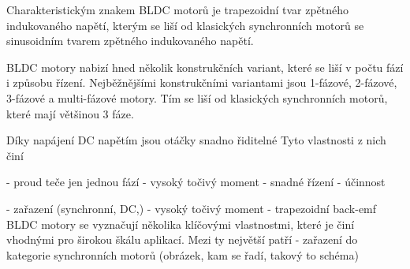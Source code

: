 Charakteristickým znakem BLDC motorů je trapezoidní tvar zpětného indukovaného napětí, kterým 
se liší od klasických synchronních motorů se sinusoidním tvarem zpětného indukovaného napětí. 

BLDC motory nabizí hned několik konstrukčních variant, které se liší v počtu fází i způsobu řízení. 
Nejběžnějšími konstrukčními variantami jsou 1-fázové, 2-fázové, 3-fázové a multi-fázové motory.
Tím se liší od klasických synchronních motorů, které mají většinou 3 fáze.



Díky napájení DC napětím jsou otáčky snadno řiditelné 
Tyto vlastnosti z nich činí  


- proud teče jen jednou fází
- vysoký točivý moment
- snadné řízení
- účinnost 




- zařazení (synchronní, DC,) 
- vysoký točivý moment
- trapezoidní back-emf
BLDC motory se vyznačují několika klíčovými vlastnostmi, které je činí vhodnými pro širokou škálu aplikací. Mezi ty největší patří 
- zařazení do kategorie synchronních motorů (obrázek, kam se řadí, takový to schéma)

